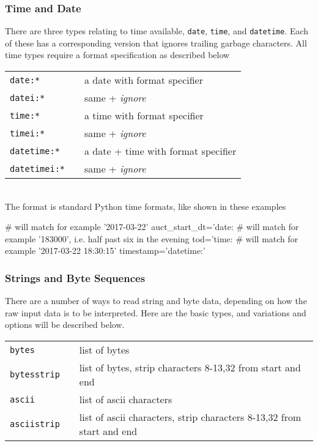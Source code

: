 \subsubsection{Time and Date}
There are three types relating to time available, \texttt{date},
\texttt{time}, and \texttt{datetime}.  Each of these has a
corresponding version that ignores trailing garbage characters.
All time types require a format specification as described below\\

\begin{tabular}{p{2cm}p{2cm}p{8cm}}
  \texttt{date:*}      && a date with format specifier\\
  \texttt{datei:*}     && same + \emph{ignore}\\
  \texttt{time:*}      && a time with format specifier\\
  \texttt{timei:*}     && same + \emph{ignore}\\
  \texttt{datetime:*}  && a date + time with format specifier\\
  \texttt{datetimei:*} && same + \emph{ignore}\\
\end{tabular}\\[1ex]
The format is standard Python time formats, like shown in these examples
\begin{python}
   # will match for example '2017-03-22'
   auct_start_dt='date:%
   # will match for example '183000', i.e. half past six in the evening
   tod='time:%
   # will match for example '2017-03-22 18:30:15'
   timestamp='datetime:'%
\end{python}


\subsubsection{Strings and Byte Sequences}
There are a number of ways to read string and byte data, depending on
how the raw input data is to be interpreted.  Here are the basic
types, and variations and options will be described below.\\

\begin{tabular}{p{2cm}p{2cm}p{8cm}}
  \texttt{bytes}      && list of bytes\\
  \texttt{bytesstrip} && list of bytes, strip characters 8-13,32 from start and end\\
  \texttt{ascii}      && list of ascii characters\\
  \texttt{asciistrip} && list of ascii characters, strip characters 8-13,32 from start and end\\
\end{tabular}\\

